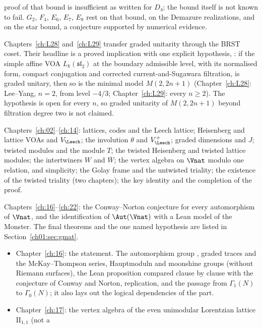 \begin{description}
\begin{itemize}
    proof of that bound is insufficient as written for $D_4$; the bound itself is not known to fail. $G_2$, $F_4$, $E_6$,
    $E_7$, $E_8$ rest on that bound, on the Demazure realizations, and on the star bound, a conjecture supported by
    numerical evidence.
  \end{itemize}
  Chapters~\ref{ch:L28} and~\ref{ch:L29} transfer graded unitarity through the BRST coset. Their headline is a
  proved implication with one explicit hypothesis, : if the simple affine VOA $L_k(\mathfrak{sl}_2)$ at the
  boundary admissible level, with its normalised form, compact conjugation and corrected current-and-Sugawara
  filtration, is graded unitary, then so is the minimal model $M(2,2n+1)$ (Chapter~\ref{ch:L28}: Lee--Yang, $n=2$,
  from level $-4/3$; Chapter~\ref{ch:L29}: every $n\ge2$). The hypothesis  is open for every $n$, so graded
  unitarity of $M(2,2n+1)$ beyond filtration degree two is not claimed.
\item[Part VII, The Moonshine module.] Chapters~\ref{ch:02}--\ref{ch:14}: lattices, codes and the
  Leech lattice; Heisenberg and lattice VOAs and $V_\Leech$; the involution $\theta$ and
  $V_\Leech^+$; graded dimensions and $J$; twisted modules and the module $T$; the twisted Heisenberg
  and twisted lattice modules; the intertwiners $W$ and $\overline W$; the vertex algebra on $\Vnat$
  modulo one relation, and simplicity; the Golay frame and the untwisted triality; the existence of
  the twisted triality (two chapters); the key identity and the completion of the proof.
\item[Part VIII, Monstrous moonshine.] Chapters~\ref{ch:16}--\ref{ch:22}: the Conway--Norton conjecture for every
  automorphism of $\Vnat$, and the identification of $\Aut(\Vnat)$ with a Lean model of the Monster. The final theorems
  and the one named hypothesis  are listed in Section~\ref{ch01:sec:gmat}.
  \begin{itemize}
  \item Chapter~\ref{ch:16}: the statement. The automorphism group , graded traces and the McKay--Thompson
    series, Hauptmoduln and moonshine groups (without Riemann surfaces), the Lean proposition
     compared clause by clause with the conjecture of Conway and Norton, replication, and
    the passage from $\Gamma_1(N)$ to $\Gamma_0(N)$; it also lays out the logical dependencies of the part.
  \item Chapter~\ref{ch:17}: the vertex algebra of the even unimodular Lorentzian lattice $\mathrm{II}_{1,1}$ (not a

\end{itemize}
\end{description}
